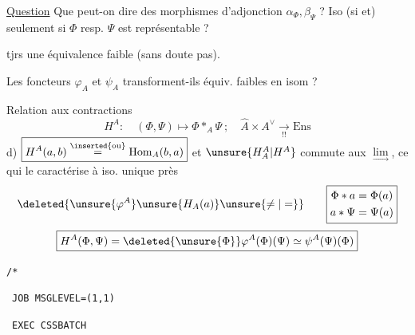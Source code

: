 \uline{Question} Que peut-on dire des morphismes d'adjonction
$\alpha_\Phi,\beta_\Psi$ ? Iso (si et) seulement si $\Phi$ resp. $\Psi$ est représentable ?

 tjrs une équivalence faible (sans doute pas).

Les foncteurs $\varphi_A$ et $\psi_A$ transforment-ils équiv. faibles en isom ?

Relation aux contractions
\[
\boxed{H^A:\quad(\Phi,\Psi)\longmapsto\Phi\mathbin{\ast_A}\Psi\ ;\quad
\widehat A\times A^\vee\underset{!!}{\longrightarrow}\mathrm{Ens}}
\]
d) \(\boxed{H^A(a,b)\overset{\inserted{\text{ou}}}{=}\mathrm{Hom}_A(b,a)}\)
et $\unsure{H^A_A|H^A}$ commute aux $\underset{\rightarrow}{\lim}$, ce qui le caractérise à iso. unique près
\[
\deleted{\unsure{\varphi^A}\unsure{H_A(a)}\unsure{\ne|=}}
\qquad\boxed{\begin{aligned}\Phi\ast a&=\Phi(a)\\a\ast\Psi&=\Psi(a)\end{aligned}}
\]
\unsure{\S}
\[
\boxed{H^A(\Phi,\Psi)=\deleted{\unsure{\Phi}}\varphi^A(\Phi)(\Psi)\simeq\psi^A(\Psi)(\Phi)}
\]

\texttt{/*}\ \unsure{\texttt{********************}}\ \qquad{}

\unsure{\texttt{//}}\ \texttt{JOB MSGLEVEL=(1,1)}

\unsure{\texttt{//}}\ \texttt{EXEC CSSBATCH}

